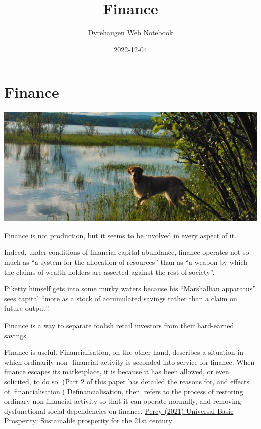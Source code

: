 \documentclass[
]{book}
\title{Finance}
\author{Dyrehaugen Web Notebook}
\date{2022-12-04}
\begin{document}
\maketitle

{
\setcounter{tocdepth}{1}
\tableofcontents
}
\hypertarget{finance}{%
\chapter{Finance}\label{finance}}

\includegraphics{fig/zelda.jpg}

Finance is not production, but it seems to be involved in every aspect of it.

Indeed, under conditions of financial capital abundance,
finance operates not so much as ``a system for the allocation of resources''
than as ``a weapon by which the claims of wealth holders are
asserted against the rest of society''.

Piketty himself gets into some murky waters because his
``Marshallian apparatus'' sees capital ``more as a stock of accumulated savings rather
than a claim on future output''.

Finance is a way to separate foolish retail investors from their hard-earned savings.

Finance is useful. Financialisation, on the other hand, describes a situation in which ordinarily non-
financial activity is seconded into service for finance. When finance escapes its marketplace, it is
because it has been allowed, or even solicited, to do so. (Part 2 of this paper has detailed the reasons
for, and effects of, financialisation.)
Definancialisation, then, refers to the process of restoring ordinary non-financial activity so that it can
operate normally, and removing dysfunctional social dependencies on finance.
\href{https://discovery.ucl.ac.uk/id/eprint/10138869/}{Percy (2021) Universal Basic Prosperity: Sustainable prosperity for the 21st century}
\end{document}
